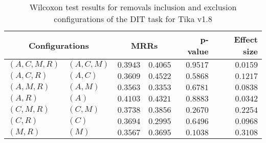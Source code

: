 
\begin{table}
\begin{spacing}{1.2}
\centering
\caption{Wilcoxon test results for removals inclusion and exclusion configurations of the DIT task for Tika v1.8}
\label{table:versus-wilcox-tika-dit-removals}
\begin{tabular}{ll|rr|rr}
\toprule
      \multicolumn{2}{c|}{Configurations} &          \multicolumn{2}{c|}{MRRs} &       p-value & Effect size \\
\midrule
 $(A,C,M,R)$ &  $(A,C,M)$ & $0.3943$ & $0.4065$ & $0.9517$ &    $0.0159$ \\
   $(A,C,R)$ &    $(A,C)$ & $0.3609$ & $0.4522$ & $0.5868$ &    $0.1217$ \\
   $(A,M,R)$ &    $(A,M)$ & $0.3563$ & $0.3353$ & $0.6781$ &    $0.0838$ \\
     $(A,R)$ &      $(A)$ & $0.4103$ & $0.4321$ & $0.8883$ &    $0.0342$ \\
   $(C,M,R)$ &    $(C,M)$ & $0.3738$ & $0.3856$ & $0.2670$ &    $0.2254$ \\
     $(C,R)$ &      $(C)$ & $0.3694$ & $0.2995$ & $0.6496$ &    $0.0968$ \\
     $(M,R)$ &      $(M)$ & $0.3567$ & $0.3695$ & $0.1038$ &    $0.3108$ \\
\bottomrule
\end{tabular}

\end{spacing}
\end{table}

